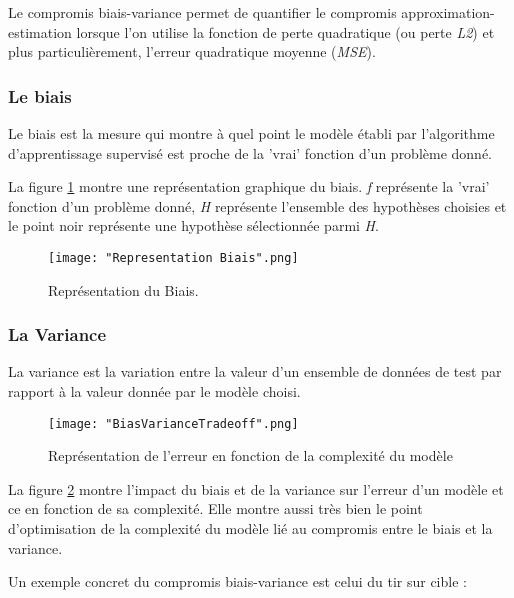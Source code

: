 \documentclass[a4paper]{article}
\begin{document}
Le compromis biais-variance permet de quantifier le compromis approximation-estimation lorsque l'on utilise la fonction de perte quadratique (ou perte \textit{L2}) et plus particulièrement, l'erreur quadratique moyenne (\textit{MSE}).

\subsubsection{Le biais}
Le biais est la mesure qui montre à quel point le modèle établi par l'algorithme d'apprentissage supervisé est proche de la 'vrai' fonction d'un problème donné. \newline

La figure \ref{BiasRepresentation} montre une représentation graphique du biais. \textit{f} représente la 'vrai' fonction d'un problème donné, \textit{H} représente l'ensemble des hypothèses choisies et le point noir représente une hypothèse sélectionnée parmi \textit{H}. \newline

\begin{figure}[!h]
	\centering
	\texttt{[image: "Representation Biais".png]}
	\caption{Représentation du Biais.}
	\cite{BiasVarianceTradeoffTextbooksUpdate}
	\label{BiasRepresentation}
\end{figure}

\subsubsection{La Variance}

La variance est la variation entre la valeur d'un ensemble de données de test par rapport à la valeur donnée par le modèle choisi. 

\newpage

\begin{figure}[!h]
	\centering
	\texttt{[image: "BiasVarianceTradeoff".png]}
	\caption{Représentation de l'erreur en fonction de la complexité du modèle}
	\cite{BiasVarianceTradeoffTextbooksUpdate}
	\label{TradeoffRepresentation}
\end{figure}

La figure \ref{TradeoffRepresentation} montre l'impact du biais et de la variance sur l'erreur d'un modèle et ce en fonction de sa complexité. Elle montre aussi très bien le point d'optimisation de la complexité du modèle lié au compromis entre le biais et la variance.

\newpage

Un exemple concret du compromis biais-variance est celui du tir sur cible :
\end{document}
